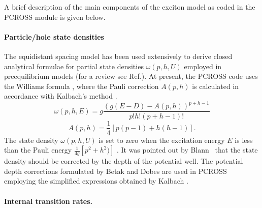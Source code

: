 A brief description of the main components of the exciton model
as coded in the PCROSS module is given below.

\paragraph{Particle/hole state densities}

The equidistant spacing model has been used extensively to derive closed
analytical formulae for partial state densities $\omega (p,h,U)$ employed in
preequilibrium models (for a review see Ref.\cite{RIPL2}). At present,
the PCROSS code uses the Williams formula \cite{Williams:71}, where the Pauli
correction $A(p,h)$ is calculated in accordance with Kalbach's method \cite%
{Kalbach:83}.
\begin{equation}
\omega (p,h,E)=g\frac{\left( g(E-D)-A(p,h)\right) ^{p+h-1}}{p!h!(p+h-1)!}
\end{equation}%
\begin{equation*}
A(p,h)=\frac{1}{4}\left[ p(p-1)+h(h-1)\right].
\end{equation*}%
The state density $\omega (p,h,U)$ is set to zero when the excitation energy
$E$ is less than the Pauli energy $\frac{1}{4g}\left[ p^{2}+h^{2})\right] $
\cite{Baguer:89}. It was pointed out by Blann~\cite{Blann:72} that the state
density should be corrected by the depth of the potential well. The
potential depth corrections formulated by Betak and Dobes \cite{Betak:76}
are used in PCROSS employing the simplified expressions obtained by Kalbach
\cite{Kalbach:77,Kalbach:83}.

\paragraph{Internal transition rates.}

